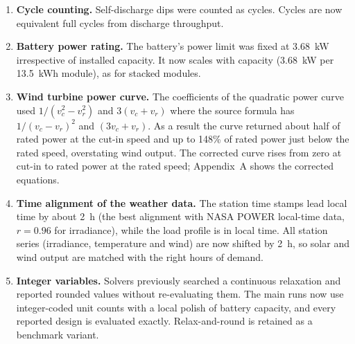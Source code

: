 \documentclass[11pt]{article}
\newcounter{rc}
\begin{document}
\begin{enumerate}[leftmargin=*,itemsep=1pt]
\item \textbf{Cycle counting.} Self-discharge dips were counted as cycles. Cycles are now equivalent full cycles from discharge throughput.
\item \textbf{Battery power rating.} The battery's power limit was fixed at 3.68~kW irrespective of installed capacity. It now scales with capacity (3.68~kW per 13.5~kWh module), as for stacked modules.
\item \textbf{Wind turbine power curve.} The coefficients of the quadratic power curve used $1/(v_c^2-v_r^2)$ and $3(v_c+v_r)$ where the source formula has $1/(v_c-v_r)^2$ and $(3v_c+v_r)$. As a result the curve returned about half of rated power at the cut-in speed and up to 148\% of rated power just below the rated speed, overstating wind output. The corrected curve rises from zero at cut-in to rated power at the rated speed; Appendix~A shows the corrected equations.
\item \textbf{Time alignment of the weather data.} The station time stamps lead local time by about 2~h (the best alignment with NASA POWER local-time data, $r = 0.96$ for irradiance), while the load profile is in local time. All station series (irradiance, temperature and wind) are now shifted by 2~h, so solar and wind output are matched with the right hours of demand.
\item \textbf{Integer variables.} Solvers previously searched a continuous relaxation and reported rounded values without re-evaluating them. The main runs now use integer-coded unit counts with a local polish of battery capacity, and every reported design is evaluated exactly. Relax-and-round is retained as a benchmark variant.
\end{enumerate}
\end{document}
